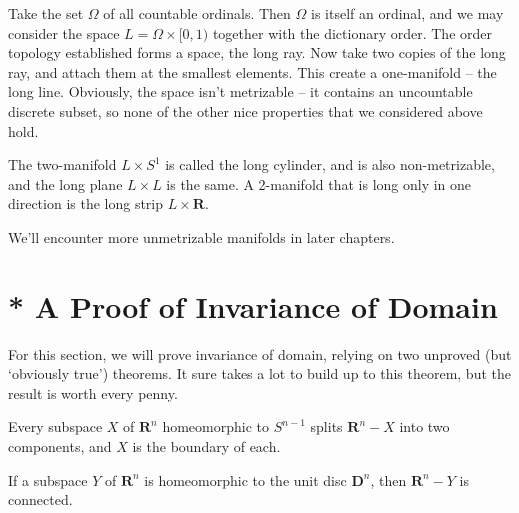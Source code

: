 \begin{example}
    Take the set $\Omega$ of all countable ordinals. Then $\Omega$ is itself an ordinal, and we may consider the space $L = \Omega \times [0,1)$ together with the dictionary order. The order topology established forms a space, the long ray. Now take two copies of the long ray, and attach them at the smallest elements. This create a one-manifold -- the long line. Obviously, the space isn't metrizable -- it contains an uncountable discrete subset, so none of the other nice properties that we considered above hold.
\end{example}

\begin{example}
    The two-manifold $L \times S^1$ is called the long cylinder, and is also non-metrizable, and the long plane $L \times L$ is the same. A 2-manifold that is long only in one direction is the long strip $L \times \mathbf{R}$.
\end{example}

We'll encounter more unmetrizable manifolds in later chapters.




















\section{* A Proof of Invariance of Domain}

For this section, we will prove invariance of domain, relying on two unproved (but `obviously true') theorems. It sure takes a lot to build up to this theorem, but the result is worth every penny.

\begin{theorem}
    Every subspace $X$ of $\mathbf{R}^n$ homeomorphic to $S^{n-1}$ splits $\mathbf{R}^n - X$ into two components, and $X$ is the boundary of each.
\end{theorem}

\begin{theorem}
    If a subspace $Y$ of $\mathbf{R}^n$ is homeomorphic to the unit disc $\mathbf{D}^n$, then $\mathbf{R}^n - Y$ is connected.
\end{theorem}

